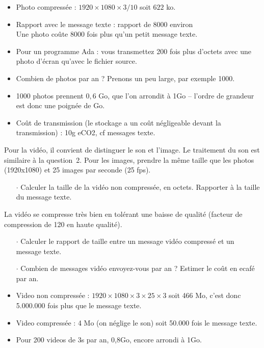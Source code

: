 \begin{reponse}
\begin{itemize}
\item Photo compressée : $1920 \times 1080 \times 3 / 10$ soit $622$ ko.
\item Rapport avec le message texte : rapport de 8000 environ\\
Une photo coûte 8000 fois plus qu'un petit message texte.
\item Pour un programme Ada : vous transmettez 200 fois plus d'octets avec une photo d'écran qu'avec le fichier source.
\item Combien de photos par an ? Prenons un peu large, par exemple 1000.
\item 1000 photos prennent $0,6$ Go, que l'on arrondit à 1Go -- l'ordre de grandeur est donc une poignée de Go.
\item Coût de transmission (le stockage a un coût négligeable devant la transmission) : 10g eCO2, cf messages texte.
\end{itemize}
\end{reponse}





Pour la vidéo, il convient de distinguer le son et l'image. Le traitement du son est similaire à la question~2. Pour les images,
prendre la même taille que les photos (1920x1080) et 25 images par seconde (25 fps).

\begin{itemize}
\item[$\cdot$] Calculer la taille de la vidéo non compressée, en octets. Rapporter à la taille du message texte.
\end{itemize}

La vidéo se compresse très bien en tolérant une baisse de qualité  (facteur de compression de 120 en haute qualité).
%
\begin{itemize}
\item[$\cdot$] Calculer le rapport de taille entre un message vidéo compressé et un message texte.
\item[$\cdot$] Combien de messages vidéo envoyez-vous par an ? Estimer le coût en ecafé par an.
\end{itemize}

\begin{reponse}
\begin{itemize}
\item Video non compressée : $1920 \times 1080 \times 3 \times 25 \times 3$ soit 466 Mo, c'est donc 5.000.000 fois plus que le message texte.
\item Video compressée : 4 Mo (on néglige le son) soit 50.000 fois le message texte.
\item Pour 200 videos de 3s par an, 0,8Go, encore arrondi à 1Go.
\end{itemize}
\end{reponse}


